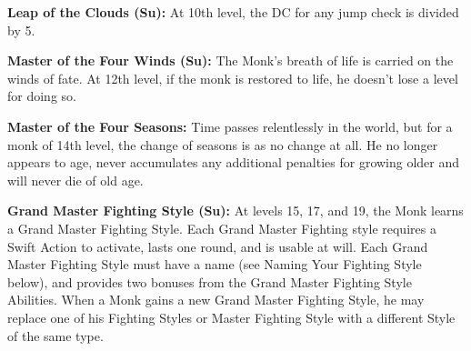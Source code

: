 \textbf{Leap of the Clouds (Su):} At 10th level, the DC for any jump check is divided by 5.

\textbf{Master of the Four Winds (Su):} The Monk's breath of life is carried on the winds of fate. At 12th level, if the monk is restored to life, he doesn't lose a level for doing so.

\textbf{Master of the Four Seasons:} Time passes relentlessly in the world, but for a monk of 14th level, the change of seasons is as no change at all. He no longer appears to age, never accumulates any additional penalties for growing older and will never die of old age.

\textbf{Grand Master Fighting Style (Su):} At levels 15, 17, and 19, the Monk learns a Grand Master Fighting Style. Each Grand Master Fighting style requires a Swift Action to activate, lasts one round, and is usable at will. Each Grand Master Fighting Style must have a name (see Naming Your Fighting Style below), and provides two bonuses from the Grand Master Fighting Style Abilities. When a Monk gains a new Grand Master Fighting Style, he may replace one of his Fighting Styles or Master Fighting Style with a different Style of the same type. 


